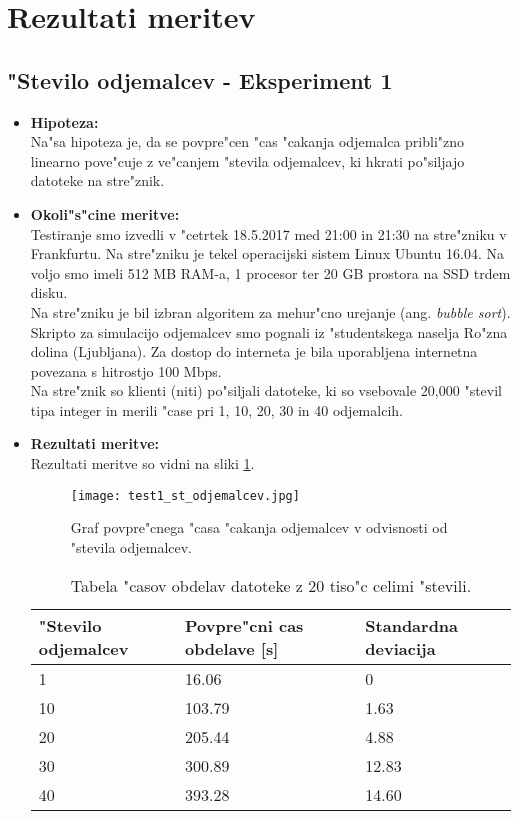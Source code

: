\newpage
\section{Rezultati meritev}


\subsection{"Stevilo odjemalcev - Eksperiment 1}
\begin{itemize}
	\item \textbf{Hipoteza: }  \\
		Na"sa hipoteza je, da se povpre"cen "cas "cakanja odjemalca pribli"zno linearno pove"cuje z ve"canjem "stevila odjemalcev, ki hkrati po"siljajo datoteke na stre"znik.

	\item \textbf{Okoli"s"cine meritve: } \\
		Testiranje smo izvedli v "cetrtek 18.5.2017 med 21:00 in 21:30 na stre"zniku v Frankfurtu. Na stre"zniku je tekel operacijski sistem Linux Ubuntu 16.04. Na voljo smo imeli 512 MB RAM-a, 1 procesor ter 20 GB prostora na SSD trdem disku.\\Na stre"zniku je bil izbran algoritem za mehur"cno urejanje (ang. \textit{bubble sort}). Skripto za simulacijo odjemalcev smo pognali iz "studentskega naselja Ro"zna dolina (Ljubljana). Za dostop do interneta je bila uporabljena internetna povezana s hitrostjo 100 Mbps.\\ Na stre"znik so klienti (niti) po"siljali datoteke, ki so vsebovale 20,000 "stevil tipa integer in merili "case pri 1, 10, 20, 30 in 40 odjemalcih.

 	\item \textbf{Rezultati meritve: }  \\
	Rezultati meritve so vidni na sliki \ref{8_graf_1_rez}.
	\begin{figure}[!htb]
  	\centering
  	  \texttt{[image: test1\_st\_odjemalcev.jpg]}
  	\caption{Graf povpre"cnega "casa "cakanja odjemalcev v odvisnosti od "stevila odjemalcev.}
  	\label{8_graf_1_rez}
	\end{figure}

	\begin{table}[!htbp]
  	\centering
  	\begin{tabular}{ | l | l | l | }
    	\hline
    	"Stevilo odjemalcev & Povpre"cni cas obdelave [s] & Standardna deviacija\\ \hline
    	1 & 16.06     & 0 \\ \hline
    	10 & 103.79 & 1.63\\ \hline
    	20 & 205.44 & 4.88\\ \hline
    	30 & 300.89 & 12.83\\ \hline
    	40 & 393.28 & 14.60\\ \hline
  	\end{tabular}
  	\caption{Tabela "casov obdelav datoteke z 20 tiso"c celimi "stevili.}
  	\label{8_table2}
  	\centering
	\end{table}


\end{itemize}
